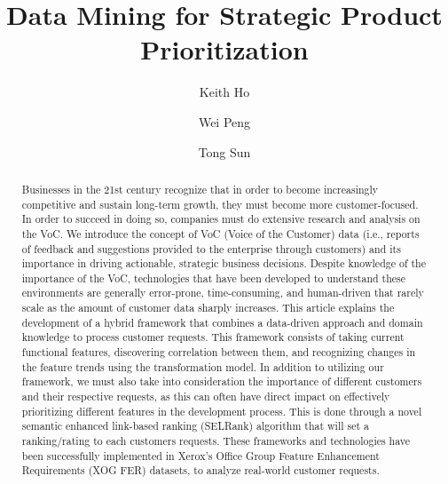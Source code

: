 \documentclass[sigconf]{acmart}
\begin{document}
\title{Data Mining for Strategic Product Prioritization}

\author{Keith Ho}

\author{Wei Peng}

\author{Tong Sun}

\begin{abstract}
Businesses in the 21st century recognize that in order to become increasingly competitive and sustain long-term growth, they must become more customer-focused. In order to succeed in doing so, companies must do extensive research and analysis on the VoC. We introduce the concept of VoC (Voice of the Customer) data (i.e., reports of feedback and suggestions provided to the enterprise through customers) and its importance in driving actionable, strategic business decisions. Despite knowledge of the importance of the VoC, technologies that have been developed to understand these environments are generally error-prone, time-consuming, and human-driven that rarely scale as the amount of customer data sharply increases. This article explains the development of a hybrid framework that combines a data-driven approach and domain knowledge to process customer requests. This framework consists of taking current functional features, discovering correlation between them, and recognizing changes in the feature trends using the transformation model. In addition to utilizing our framework, we must also take into consideration the importance of different customers and their respective requests, as this can often have direct impact on effectively prioritizing different features in the development process. This is done through a novel semantic enhanced link-based ranking (SELRank) algorithm that will set a ranking/rating to each customers requests. These frameworks and technologies have been successfully implemented in Xerox's Office Group Feature Enhancement Requirements (XOG FER) datasets, to analyze real-world customer requests. 

\end{abstract}


\maketitle
\end{document}
